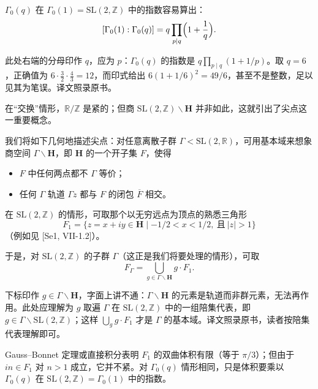 $\Gamma_{0}(q)$ 在 $\Gamma_{0}(1)=\mathrm{SL}(2,\mathbb{Z})$ 中的指数容易算出：
\[
[\Gamma_{0}(1):\Gamma_{0}(q)]=q\prod_{p\mid q}\Bigl(1+\frac{1}{q}\Bigr).
\]

\begin{annote}
此处右端的分母印作 $q$，应为 $p$：$\Gamma_{0}(q)$ 的指数是 $q\prod_{p\mid q}(1+1/p)$。取 $q=6$，正确值为 $6\cdot\frac32\cdot\frac43=12$，而印式给出 $6(1+1/6)^{2}=49/6$，甚至不是整数，足以见其为笔误。译文照录原书。
\par\vspace{0.15em}{\raggedleft 【来源：原书 §3（A）；Iwaniec《Topics in Classical Automorphic Forms》第 2 章（A）】\par}
\end{annote}

在“交换”情形，$\mathbb{R}/\mathbb{Z}$ 是紧的；但商 $\mathrm{SL}(2,\mathbb{Z})\backslash\mathbf{H}$ 并非如此，这就引出了尖点这一重要概念。

我们将如下几何地描述尖点：对任意离散子群 $\Gamma<\mathrm{SL}(2,\mathbb{R})$，可用基本域来想象商空间 $\Gamma\backslash\mathbf{H}$，即 $\mathbf{H}$ 的一个开子集 $F$，使得
\begin{itemize}[leftmargin=2em]
\item $F$ 中任何两点都不 $\Gamma$ 等价；
\item 任何 $\Gamma$ 轨道 $\Gamma z$ 都与 $F$ 的闭包 $\overline{F}$ 相交。
\end{itemize}
在 $\mathrm{SL}(2,\mathbb{Z})$ 的情形，可取那个以无穷远点为顶点的熟悉三角形
\[
F_{1}=\{z=x+iy\in\mathbf{H}\mid-1/2<x<1/2,\ \text{且}\ |z|>1\}
\]
（例如见 [Se1, VII-1.2]）。

于是，对 $\mathrm{SL}(2,\mathbb{Z})$ 的子群 $\Gamma$（这正是我们将要处理的情形），可取
\[
F_{\Gamma}=\bigcup_{g\in\Gamma\backslash\mathbf{H}}g\cdot F_{1}.
\]

\begin{annote}
下标印作 $g\in\Gamma\backslash\mathbf{H}$，字面上讲不通：$\Gamma\backslash\mathbf{H}$ 的元素是轨道而非群元素，无法再作用。此处应理解为 $g$ 取遍 $\Gamma$ 在 $\mathrm{SL}(2,\mathbb{Z})$ 中的一组陪集代表，即 $g\in\Gamma\backslash\mathrm{SL}(2,\mathbb{Z})$；这样 $\bigcup_{g}g\cdot F_{1}$ 才是 $\Gamma$ 的基本域。译文照录原书，读者按陪集代表理解即可。
\par\vspace{0.15em}{\raggedleft 【来源：原书 §3（A）；Serre《Cours d'arithmétique》第 VII 章（A）】\par}
\end{annote}
Gauss--Bonnet 定理或直接积分表明 $F_{1}$ 的双曲体积有限（等于 $\pi/3$）；但由于 $in\in F_{1}$ 对 $n>1$ 成立，它并不紧。对 $\Gamma_{0}(q)$ 情形相同，只是体积要乘以 $\Gamma_{0}(q)$ 在 $\mathrm{SL}(2,\mathbb{Z})=\Gamma_{0}(1)$ 中的指数。

